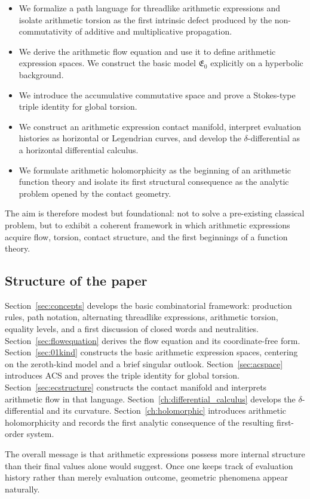 \begin{itemize}
  \item We formalize a path language for threadlike arithmetic expressions and isolate arithmetic torsion as the first intrinsic defect produced by the non-commutativity of additive and multiplicative propagation.

  \item We derive the arithmetic flow equation and use it to define arithmetic expression spaces. We construct the basic model $\mathfrak{E}_0$ explicitly on a hyperbolic background.

  \item We introduce the accumulative commutative space and prove a Stokes-type triple identity for global torsion.

  \item We construct an arithmetic expression contact manifold, interpret evaluation histories as horizontal or Legendrian curves, and develop the $\delta$-differential as a horizontal differential calculus.

  \item We formulate arithmetic holomorphicity as the beginning of an arithmetic function theory and isolate its first structural consequence as the analytic problem opened by the contact geometry.
\end{itemize}

The aim is therefore modest but foundational: not to solve a pre-existing classical problem, but to exhibit a coherent framework in which arithmetic expressions acquire flow, torsion, contact structure, and the first beginnings of a function theory.

\subsection{Structure of the paper}

Section~\ref{sec:concepts} develops the basic combinatorial framework: production rules, path notation, alternating threadlike expressions, arithmetic torsion, equality levels, and a first discussion of closed words and neutralities.
Section~\ref{sec:flowequation} derives the flow equation and its coordinate-free form.
Section~\ref{sec:01kind} constructs the basic arithmetic expression spaces, centering on the zeroth-kind model and a brief singular outlook.
Section~\ref{sec:acspace} introduces ACS and proves the triple identity for global torsion.
Section~\ref{sec:ecstructure} constructs the contact manifold and interprets arithmetic flow in that language.
Section~\ref{ch:differential_calculus} develops the $\delta$-differential and its curvature.
Section~\ref{ch:holomorphic} introduces arithmetic holomorphicity and records the first analytic consequence of the resulting first-order system.

The overall message is that arithmetic expressions possess more internal structure than their final values alone would suggest. Once one keeps track of evaluation history rather than merely evaluation outcome, geometric phenomena appear naturally.
